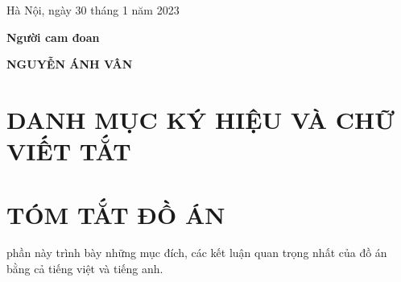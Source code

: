 \documentclass{article}
\renewcommand{\figurename}{\fontsize{12pt}{0pt}\selectfont \bfseries Hình}
\renewcommand{\tablename}{\fontsize{12pt}{0pt}\selectfont \bfseries Bảng}
\begin{document}
\vspace{6pt}
\hspace{7cm}
Hà Nội, ngày 30 tháng 1 năm 2023

\hspace{9cm}\textbf{Người cam đoan} 
\vspace{2cm}

\hspace{8.65cm} \textbf{NGUYỄN ÁNH VÂN}
\cleardoublepage

\tableofcontents %
\thispagestyle{empty}
\cleardoublepage

\section*{DANH MỤC KÝ HIỆU VÀ CHỮ VIẾT TẮT}
{}
\cleardoublepage

{
\let\oldnumberline\numberline
\renewcommand{\numberline}{\figurename~\oldnumberline}
\listoffigures} %
{}
\cleardoublepage

{
\let\oldnumberline\numberline
\renewcommand{\numberline}{\tablename~\oldnumberline}
\listoftables
}
\cleardoublepage

\section*{TÓM TẮT ĐỒ ÁN}
{}
phần này trình bày những mục đích, các kết luận quan trọng nhất của đồ án bằng cả tiếng việt và tiếng anh.
\cleardoublepage

\end{document}

